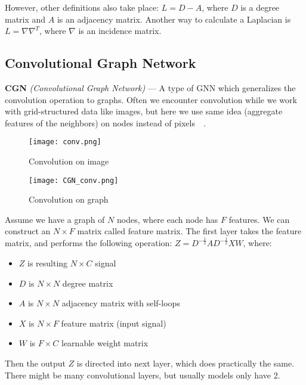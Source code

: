     However, other definitions also take place: $L = D - A$, where $D$ is a degree matrix and $A$ is an adjacency matrix.
    Another way to calculate a Laplacian is $L = \nabla\nabla^{T}$, where $\nabla$ is an incidence matrix.


\subsection*{Convolutional Graph Network}

    \textbf{CGN} \textit{(Convolutional Graph Network)} --- A type of GNN which generalizes the convolution operation to graphs.
    Often we encounter convolution while we work with grid-structured data like images, but here we use same idea (aggregate features of the neighbors) on nodes instead of pixels~\cite{Wu_Pan_Chen_Long_Zhang_Yu_2021}~\cite{Kipf_Welling_2017}.

    \begin{figure}[h]
        \begin{multicols}{2}
            \centering
            \texttt{[image: conv.png]}
            \caption{Convolution on image}
        
            \centering
            \texttt{[image: CGN\_conv.png]}
            \caption{Convolution on graph}
        \end{multicols}
    \end{figure}

    Assume we have a graph of $N$ nodes, where each node has $F$ features.
    We can construct an $N \times F$ matrix called feature matrix.
    The first layer takes the feature matrix, and performs the following operation: $Z = D^{-\frac{1}{2}} A D^{-\frac{1}{2}} X W$, where: 
    \begin{itemize}
        \item $Z$ is resulting $N \times C$ signal
        \item $D$ is $N \times N$ degree matrix
        \item $A$ is $N \times N$ adjacency matrix with self-loops
        \item $X$ is $N \times F$ feature matrix (input signal)
        \item $W$ is $F \times C$ learnable weight matrix
    \end{itemize}

    Then the output $Z$ is directed into next layer, which does practically the same.
    There might be many convolutional layers, but usually models only have 2.

